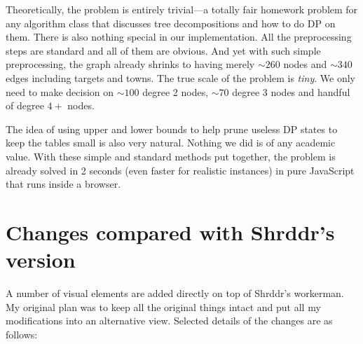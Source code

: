 \documentclass[11pt]{article}
\theoremstyle{definition}
\theoremstyle{remark}
\begin{document}
Theoretically, the problem is entirely trivial---a totally fair homework problem for any algorithm class that discusses tree decompositions and how to do DP on them. There is also nothing special in our implementation. All the preprocessing steps are standard and all of them are obvious. And yet with such simple preprocessing, the graph already shrinks to having merely $\sim 260$ nodes and $\sim 340$ edges including targets and towns. The true scale of the problem is \textit{tiny}. We only need to make decision on $\sim 100$ degree 2 nodes, $\sim 70$ degree 3 nodes and handful of degree $4+$ nodes.

The idea of using upper and lower bounds to help prune useless DP states to keep the tables small is also very natural. Nothing we did is of any academic value. With these simple and standard methods put together, the problem is already solved in 2 seconds (even faster for realistic instances) in pure JavaScript that runs inside a browser.


\appendix

\section{Changes compared with Shrddr's version}
\label{change}
A number of visual elements are added directly on top of Shrddr's workerman. My original plan was to keep all the original things intact and put all my modifications into an alternative view. Selected details of the changes are as follows:
\end{document}
